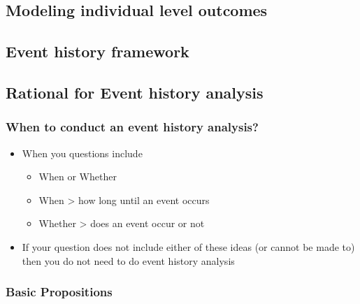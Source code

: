 \documentclass[
]{article}
\providecommand{\tightlist}{%
  \setlength{\itemsep}{0pt}\setlength{\parskip}{0pt}}
\begin{document}
\hypertarget{modeling-individual-level-outcomes}{%
\subsection{Modeling individual level outcomes}\label{modeling-individual-level-outcomes}}

\hypertarget{event-history-framework}{%
\subsection{Event history framework}\label{event-history-framework}}

\hypertarget{rational-for-event-history-analysis}{%
\subsection{Rational for Event history analysis}\label{rational-for-event-history-analysis}}

\hypertarget{when-to-conduct-an-event-history-analysis}{%
\subsubsection{When to conduct an event history analysis?}\label{when-to-conduct-an-event-history-analysis}}

\begin{itemize}
\tightlist
\item
  When you questions include

  \begin{itemize}
  \tightlist
  \item
    When or Whether
  \item
    When \textgreater{} how long until an event occurs
  \item
    Whether \textgreater{} does an event occur or not
  \end{itemize}
\item
  If your question does not include either of these ideas (or cannot be made to) then you do not need to do event history analysis
\end{itemize}

\hypertarget{basic-propositions}{%
\subsubsection{Basic Propositions}\label{basic-propositions}}
\end{document}
